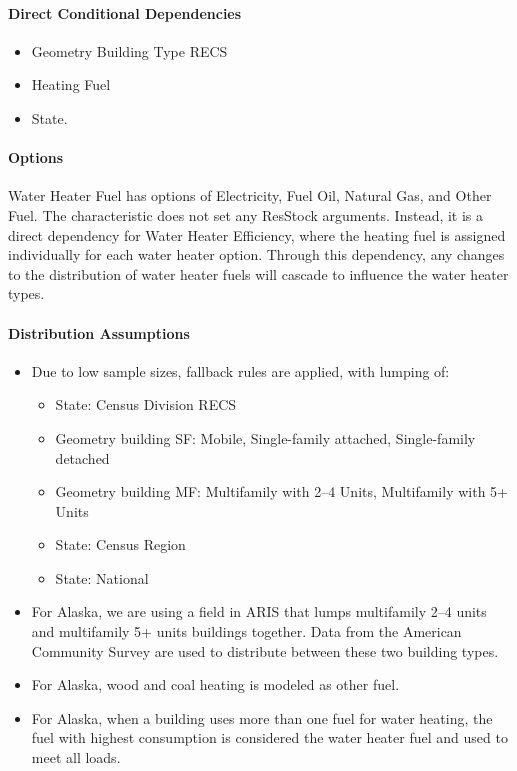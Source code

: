 \paragraph{Direct Conditional Dependencies}
\begin{itemize}
    \item Geometry Building Type RECS
    \item Heating Fuel
    \item State.
\end{itemize}

\paragraph{Options}
Water Heater Fuel has options of Electricity, Fuel Oil, Natural Gas, and Other Fuel. The characteristic does not set any ResStock arguments. Instead, it is a direct dependency for Water Heater Efficiency, where the heating fuel is assigned individually for each water heater option. Through this dependency, any changes to the distribution of water heater fuels will cascade to influence the water heater types.

\paragraph{Distribution Assumptions}
\begin{itemize}
\item
  Due to low sample sizes, fallback rules are applied, with lumping of:
  
  \begin{itemize}
  \item
    State: Census Division RECS
  \item
    Geometry building SF: Mobile, Single-family attached, Single-family detached
  \item
    Geometry building MF: Multifamily with 2--4 Units,
    Multifamily with 5+ Units
  \item
    State: Census Region
\item 
State: National
  \end{itemize}
\item
  For Alaska, we are using a field in ARIS that lumps multifamily 2--4
  units and multifamily 5+ units buildings together. Data from the
  American Community Survey are used to distribute between these two
  building types.
\item
  For Alaska, wood and coal heating is modeled as other fuel.
\item
  For Alaska, when a building uses more than one fuel for water heating,
  the fuel with highest consumption is considered the water heater fuel and used to meet all loads.
\end{itemize}

